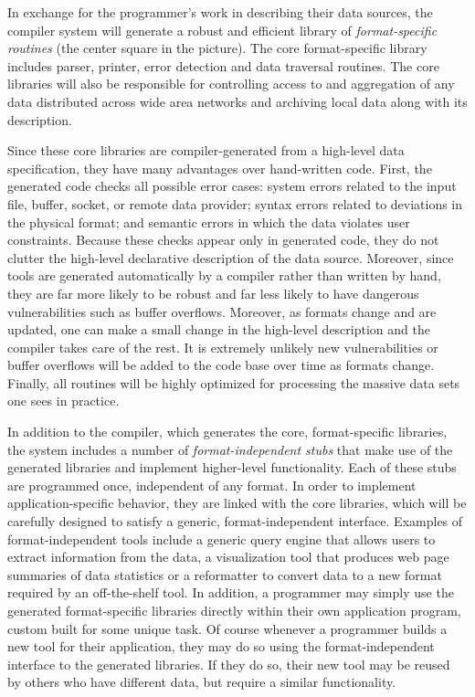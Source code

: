 \documentclass{sigplanconf}
\begin{document}
In exchange for the programmer's work in describing their
data sources, the compiler system will generate
a robust and efficient library of {\em format-specific routines} (the center
square in the picture).
The core format-specific 
library includes parser, printer, error detection and data traversal
routines.  The core libraries will also be responsible for controlling
access to and aggregation of any data distributed across wide area
networks and archiving local data along with its description.  

Since these core libraries are compiler-generated from a
high-level data specification, they have many advantages over
hand-written code.  First, the generated code checks
all possible error cases: system errors related to the input file,
buffer, socket, or remote data provider; 
syntax errors related to deviations in the physical
format; and semantic errors in which the data violates user
constraints.  Because these checks appear only in generated code, they
do not clutter the high-level declarative description of the data
source.  Moreover, since tools are generated
automatically by a compiler rather than written by hand, 
they are far more likely to be robust
and far less likely to have dangerous vulnerabilities such as
buffer overflows.  Moreover, as formats change and are updated,
one can make a small change in the high-level description
and the compiler takes care of the rest.  It is extremely unlikely
new vulnerabilities or buffer overflows will be added to the code
base over time as formats change.  Finally, all routines will
be highly optimized for processing the massive
data sets one sees in practice.

In addition to the compiler, which generates the core, format-specific
libraries, the system includes a number of {\em format-independent stubs}
that make use of the generated libraries and implement higher-level
functionality.  Each of these stubs are programmed once, independent
of any format.  In order to implement application-specific behavior, they
are linked with the core libraries, which will be carefully designed to
satisfy a generic, format-independent interface.  Examples of
format-independent tools include a generic query engine that
allows users to extract information from the data, 
a visualization tool that produces
web page summaries of data statistics or a reformatter to convert data
to a new format required by an off-the-shelf tool.  In addition,
a programmer may simply use the generated format-specific libraries directly 
within their own application program, custom built for some unique task. 
Of course whenever a programmer builds a new tool for their application, 
they may do so using the format-independent interface to the generated
libraries.  If they do so, their new tool may be reused by others
who have different data, but require a similar functionality.
\end{document}
